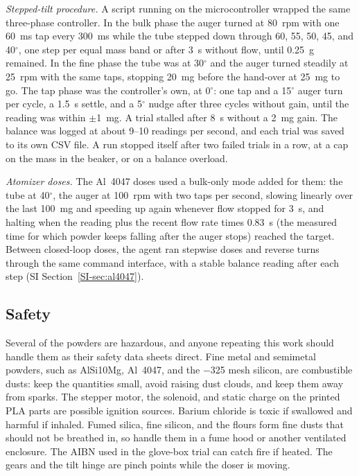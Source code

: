 \documentclass[twoside,twocolumn,9pt]{article}
\newcommand{\siref}[1]{\ref*{SI-#1}}
\begin{document}
\emph{Stepped-tilt procedure.} A script running on the microcontroller wrapped the same three-phase controller. In the bulk phase the auger turned at 80~rpm with one 60~ms tap every 300~ms while the tube stepped down through 60, 55, 50, 45, and 40$^\circ$, one step per equal mass band or after 3~s without flow, until 0.25~g remained. In the fine phase the tube was at 30$^\circ$ and the auger turned steadily at 25~rpm with the same taps, stopping 20~mg before the hand-over at 25~mg to go. The tap phase was the controller's own, at 0$^\circ$: one tap and a 15$^\circ$ auger turn per cycle, a 1.5~s settle, and a 5$^\circ$ nudge after three cycles without gain, until the reading was within $\pm$1~mg. A trial stalled after 8~s without a 2~mg gain. The balance was logged at about 9--10 readings per second, and each trial was saved to its own CSV file. A run stopped itself after two failed trials in a row, at a cap on the mass in the beaker, or on a balance overload.

\emph{Atomizer doses.} The Al~4047 doses used a bulk-only mode added for them: the tube at 40$^\circ$, the auger at 100~rpm with two taps per second, slowing linearly over the last 100~mg and speeding up again whenever flow stopped for 3~s, and halting when the reading plus the recent flow rate times 0.83~s (the measured time for which powder keeps falling after the auger stops) reached the target. Between closed-loop doses, the agent ran stepwise doses and reverse turns through the same command interface, with a stable balance reading after each step (SI Section~\siref{sec:al4047}).

\subsection{Safety}
Several of the powders are hazardous, and anyone repeating this work should handle them as their safety data sheets direct. Fine metal and semimetal powders, such as AlSi10Mg, Al~4047, and the $-$325 mesh silicon, are combustible dusts: keep the quantities small, avoid raising dust clouds, and keep them away from sparks. The stepper motor, the solenoid, and static charge on the printed PLA parts are possible ignition sources. Barium chloride is toxic if swallowed and harmful if inhaled. Fumed silica, fine silicon, and the flours form fine dusts that should not be breathed in, so handle them in a fume hood or another ventilated enclosure. The AIBN used in the glove-box trial can catch fire if heated. The gears and the tilt hinge are pinch points while the doser is moving.
\end{document}
